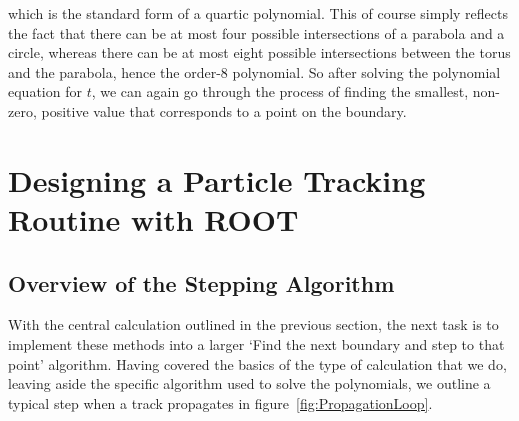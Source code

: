 \documentclass[11pt,a4paper,oneside]{article}
\begin{document}
which is the standard form of a quartic polynomial. This of course simply reflects the fact that there can be at most four possible intersections of a parabola and a circle, whereas there can be at most eight possible intersections between the torus and the parabola, hence the order-8 polynomial. So after solving the polynomial equation for $t$, we can again go through the process of finding the smallest, non-zero, positive value that corresponds to a point on the boundary. 

\section{Designing a Particle Tracking Routine with ROOT}

\subsection{Overview of the Stepping Algorithm}

With the central calculation outlined in the previous section, the next task is to implement these methods into a larger `Find the next boundary and step to that point' algorithm. Having covered the basics of the type of calculation that we do, leaving aside the specific algorithm used to solve the polynomials, we outline a typical step when a track propagates in figure~\ref{fig:PropagationLoop}. 
\end{document}
